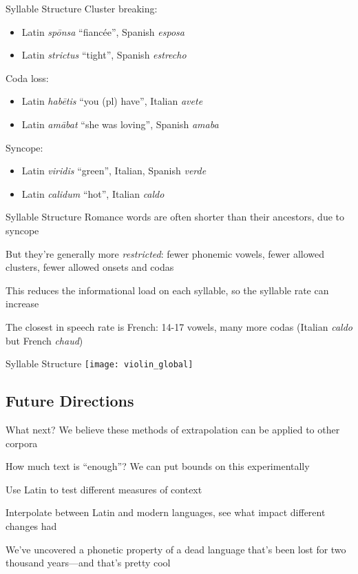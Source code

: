 \documentclass{beamer}
\begin{document}
\begin{frame}{Syllable Structure}
Cluster breaking:
\vspace{-1em}
\begin{itemize}
\item Latin \emph{spōnsa} ``fiancée'', Spanish \emph{esposa}
\item Latin \emph{strictus} ``tight'', Spanish \emph{estrecho}
\end{itemize}

Coda loss:
\vspace{-1em}
\begin{itemize}
\item Latin \emph{habētis} ``you (pl) have'', Italian \emph{avete}
\item Latin \emph{amābat} ``she was loving'', Spanish \emph{amaba}
\end{itemize}

Syncope:
\vspace{-1em}
\begin{itemize}
\item Latin \emph{viridis} ``green'', Italian, Spanish \emph{verde}
\item Latin \emph{calidum} ``hot'', Italian \emph{caldo}
\end{itemize}
\end{frame}

\begin{frame}{Syllable Structure}
Romance words are often shorter than their ancestors, due to syncope

But they're generally more \emph{restricted}: fewer phonemic vowels, fewer allowed clusters, fewer allowed onsets and codas

This reduces the informational load on each syllable, so the syllable rate can increase

The closest in speech rate is French: 14-17 vowels, many more codas (Italian \emph{caldo} but French \emph{chaud})
\end{frame}

\begin{frame}{Syllable Structure}
\texttt{[image: violin\_global]}
\end{frame}

\subsection{Future Directions}

\begin{frame}{What next?}
We believe these methods of extrapolation can be applied to other corpora

How much text is ``enough''? We can put bounds on this experimentally

Use Latin to test different measures of context

Interpolate between Latin and modern languages, see what impact different changes had

We've uncovered a phonetic property of a dead language that's been lost for two thousand years---and that's pretty cool
\end{frame}
\end{document}
